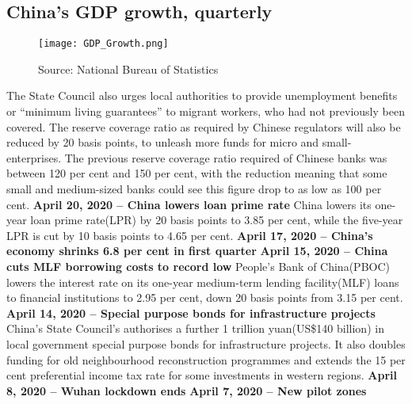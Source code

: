 \documentclass[11pt, a4paper]{article}
\begin{document}
        \subsection{China's GDP growth, quarterly}

            \begin{figure}[H]
                \texttt{[image: GDP\_Growth.png]}
                \caption*{Source: National Bureau of Statistics}
            \end{figure}

            The State Council also urges local authorities to provide unemployment benefits or “minimum living guarantees” to migrant workers, who had not previously been covered.
            \bigbreak
            The reserve coverage ratio as required by Chinese regulators will also be reduced by 20 basis points, to unleash more funds for micro and small-enterprises. The previous reserve coverage ratio required of Chinese banks was between 120 per cent and 150 per cent, with the reduction meaning that some small and medium-sized banks could see this figure drop to as low as 100 per cent.
            \bigbreak
            \noindent
            \textbf{April 20, 2020 – China lowers loan prime rate}
            \bigbreak
            China lowers its one-year loan prime rate(LPR) by 20 basis points to 3.85 per cent, while the five-year LPR is cut by 10 basis points to 4.65 per cent.
            \bigbreak
            \noindent
            \textbf{\Large April 17, 2020 – China's economy shrinks 6.8 per cent in first quarter}
            \bigbreak
            \noindent
            \textbf{April 15, 2020 – China cuts MLF borrowing costs to record low}
            \bigbreak
            People’s Bank of China(PBOC) lowers the interest rate on its one-year medium-term lending facility(MLF) loans to financial institutions to 2.95 per cent, down 20 basis points from 3.15 per cent.
            \bigbreak
            \noindent
            \textbf{April 14, 2020 – Special purpose bonds for infrastructure projects}
            \bigbreak
            China’s State Council’s authorises a further 1 trillion yuan(US\$140 billion) in local government special purpose bonds for infrastructure projects. It also doubles funding for old neighbourhood reconstruction programmes and extends the 15 per cent preferential income tax rate for some investments in western regions.
            \bigbreak
            \noindent
            \textbf{\Large April 8, 2020 – Wuhan lockdown ends}
            \bigbreak
            \noindent
            \textbf{April 7, 2020 – New pilot zones}
\end{document}
